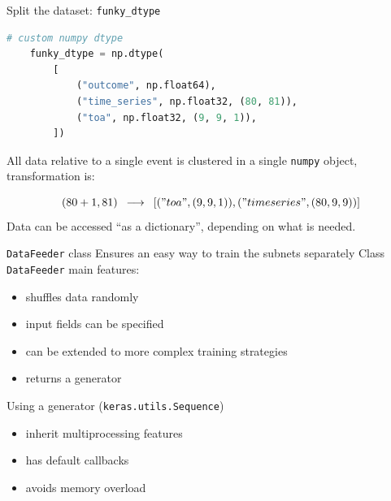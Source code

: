 \documentclass{beamer}
\begin{document}
\begin{frame}[fragile]{Split the dataset: \texttt{funky\_dtype}}

    
    \begin{lstlisting}[language=Python]
    # custom numpy dtype
    funky_dtype = np.dtype(
        [
            ("outcome", np.float64),
            ("time_series", np.float32, (80, 81)),
            ("toa", np.float32, (9, 9, 1)),
        ])
    \end{lstlisting}
    
    All data relative to a single event is clustered in a single \texttt{numpy} object, transformation is:
    
    \begin{equation*}
        (80 + 1, 81)\,\,\, \longrightarrow \,\,\, [("toa", (9, 9, 1)), ("timeseries", (80, 9,9))]
    \end{equation*}
    Data can be accessed ``as a dictionary'', depending on what is needed.

\end{frame}


\begin{frame}{\texttt{DataFeeder} class}
    Ensures an easy way to train the subnets separately %
    Class \texttt{DataFeeder} main features:
    \begin{itemize}
        \item[\textbullet] shuffles data randomly
        \item[\textbullet] input fields can be specified
        \item[\textbullet] can be extended to more complex training strategies
        \item[\textbullet] returns a generator
    \end{itemize}
    

\vspace{20 pt}
    Using a generator (\texttt{keras.utils.Sequence})
    \begin{itemize}
        \item[\textbullet] inherit multiprocessing features
        \item[\textbullet] has default callbacks
        \item[\textbullet] avoids memory overload
    \end{itemize}
    
\end{frame}
\end{document}
